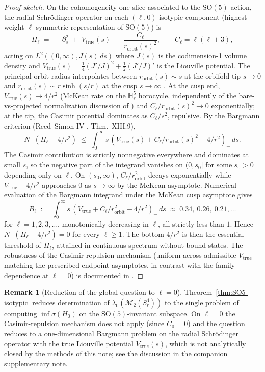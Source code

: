 \documentclass[11pt,letterpaper]{article}
\theoremstyle{definition}
\newtheorem{remark}[theorem]{Remark}
\newcommand{\bbH}{\mathbb{H}}
\newcommand{\cM}{\mathcal{M}}
\begin{document}
\begin{proof}[Proof sketch]
On the cohomogeneity-one slice associated to the $\mathrm{SO}(5)$-action, the radial Schr\"odinger operator on each $(\ell, 0)$-isotypic component (highest-weight $\ell$ symmetric representation of $\mathrm{SO}(5)$) is
\[
H_\ell \;=\; -\partial_s^2 \;+\; V_{\mathrm{true}}(s) \;+\; \frac{C_\ell}{r_{\mathrm{orbit}}(s)^2},\qquad C_\ell = \ell(\ell+3),
\]
acting on $L^2((0,\infty), J(s)\,ds)$ where $J(s)$ is the codimension-1 volume density and $V_{\mathrm{true}}(s) = \tfrac14(J'/J)^2 + \tfrac12(J'/J)'$ is the Liouville potential. The principal-orbit radius interpolates between $r_{\mathrm{orbit}}(s) \sim s$ at the orbifold tip $s\to 0$ and $r_{\mathrm{orbit}}(s) \sim r\sinh(s/r)$ at the cusp $s\to\infty$ \cite{m2-isotypic-decomposition}. At the cusp end, $V_{\mathrm{true}}(s) \to 4/r^2$ (McKean rate on the $\bbH^5_r$ horocycle, independently of the bare-vs-projected normalization discussion of \cite{m2-closure-higher-order}) and $C_\ell/r_{\mathrm{orbit}}(s)^2 \to 0$ exponentially; at the tip, the Casimir potential dominates as $C_\ell/s^2$, repulsive. By the Bargmann criterion (Reed--Simon IV \cite{ReedSimonIV}, Thm.~XIII.9),
\[
N_-(H_\ell - 4/r^2) \;\le\; \int_0^\infty s\,(V_{\mathrm{true}}(s) + C_\ell/r_{\mathrm{orbit}}(s)^2 - 4/r^2)_-\,ds.
\]
The Casimir contribution is strictly nonnegative everywhere and dominates at small $s$, so the negative part of the integrand vanishes on $(0, s_0]$ for some $s_0 > 0$ depending only on $\ell$. On $(s_0,\infty)$, $C_\ell/r_{\mathrm{orbit}}^2$ decays exponentially while $V_{\mathrm{true}}-4/r^2$ approaches $0$ as $s\to\infty$ by the McKean asymptote. Numerical evaluation \cite{m2-isotypic-decomposition} of the Bargmann integrand under the McKean cusp asymptote gives
\[
B_\ell \;:=\; \int_0^\infty s\,(V_{\mathrm{true}}+ C_\ell/r_{\mathrm{orbit}}^2 - 4/r^2)_-\,ds \;\approx\; 0.34,\ 0.26,\ 0.21,\ldots
\]
for $\ell = 1,2,3,\ldots$, monotonically decreasing in $\ell$, all strictly less than $1$. Hence $N_-(H_\ell - 4/r^2) = 0$ for every $\ell \ge 1$. The bottom $4/r^2$ is then the essential threshold of $H_\ell$, attained in continuous spectrum without bound states. The robustness of the Casimir-repulsion mechanism (uniform across admissible $V_{\mathrm{true}}$ matching the prescribed endpoint asymptotes, in contrast with the family-dependence at $\ell = 0$) is documented in \cite{m2-isotypic-decomposition}.
\end{proof}

\begin{remark}[Reduction of the global question to $\ell = 0$]\label{rmk:isotypic-reduction}
Theorem~\ref{thm:SO5-isotypic} reduces determination of $\lambda_0(\cM_2(S^4_r))$ to the single problem of computing $\inf\sigma(H_0)$ on the $\mathrm{SO}(5)$-invariant subspace. On $\ell = 0$ the Casimir-repulsion mechanism does not apply (since $C_0 = 0$) and the question reduces to a one-dimensional Bargmann problem on the radial Schr\"odinger operator with the true Liouville potential $V_{\mathrm{true}}(s)$, which is not analytically closed by the methods of this note; see the discussion in the companion supplementary note.
\end{remark}
\end{document}

